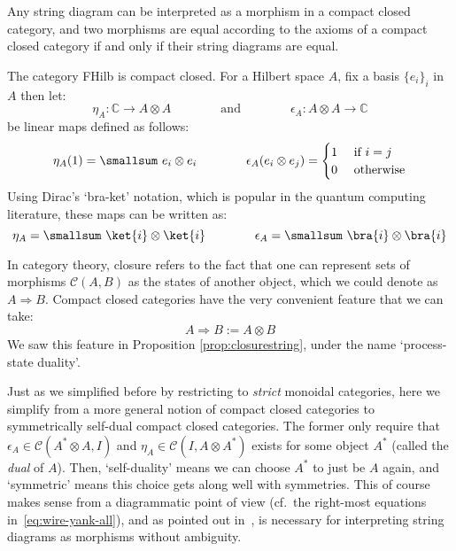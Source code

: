 \documentclass[10pt]{article}
\begin{document}
\begin{theorem}\label{thm:string-cmpcc}
  Any string diagram can be interpreted as a morphism in a compact closed category, and two morphisms are equal according to the axioms of a compact closed category if and only if their string diagrams are equal.
\end{theorem}

\begin{example}\label{ex:hilb-compact}
The category FHilb is compact closed. For a Hilbert space $A$, fix a basis $\{ e_i \}_i$ in $A$ then let:
\[ 
\eta_A : \mathbb C \to A \otimes A
   \qquad\qquad\textrm{and}\qquad\qquad 
   \epsilon_A : A \otimes A \to \mathbb C
\]
be linear maps defined as follows:
\[
   \eta_{A}(1) = \smallsum\ e_i \otimes e_i
   \qquad\qquad
   \epsilon_{A}(e_i \otimes e_j) = \begin{cases}
    1 & \textrm{ if } i = j \\
    0 & \textrm{ otherwise}
   \end{cases}   
   \]
Using Dirac's  `bra-ket' notation,  which is popular in the quantum computing literature, these maps can be written as:
\[ 
\eta_A = \smallsum\ \ket{i} \otimes \ket{i}
   \qquad\qquad
   \epsilon_A = \smallsum\ \bra{i} \otimes \bra{i} 
\]
\end{example}

In category theory, closure refers to the fact that one can represent sets of morphisms $\mathcal C(A,B)$ as the states of another object, which we could denote as $A\Rightarrow B$.  Compact closed categories have the very convenient feature that we can take: 
\[
A\Rightarrow B := A\otimes B
\]
We saw this feature in Proposition \ref{prop:closurestring},  under the name `process-state duality'.

Just as we simplified before by restricting to \textit{strict} monoidal categories, here we simplify from a more general notion of compact closed categories to symmetrically self-dual compact closed categories. The former only require that $\epsilon_A \in \mathcal C(A^* \otimes A, I)$ and $\eta_A \in \mathcal C(I, A \otimes A^*)$ exists for some object $A^*$ (called the \textit{dual} of $A$). Then, `self-duality' means we can choose $A^*$ to just be $A$ again, and `symmetric' means this choice gets along well with symmetries.  This of course makes sense from a diagrammatic point of view (cf.~the right-most equations in~\eqref{eq:wire-yank-all}),  and as pointed out in~\cite{SelingerSelfDual}, is necessary for interpreting string diagrams as morphisms without ambiguity. 
\end{document}

